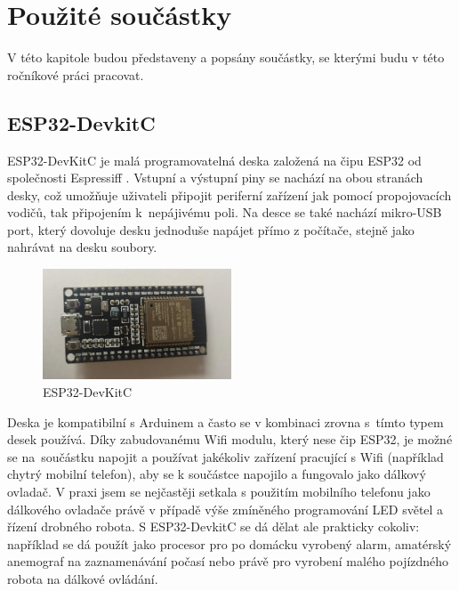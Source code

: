 \chapter{Použité součástky}
V této kapitole budou představeny a popsány součástky, se kterými budu v této ročníkové práci pracovat.

\section{ESP32-DevkitC}
ESP32-DevKitC \cite{devkitc-datasheet} je malá programovatelná deska založená na čipu ESP32 od společnosti Espressiff \cite{espressif}. Vstupní a výstupní piny se nachází na obou stranách desky, což umožňuje uživateli připojit periferní zařízení jak pomocí propojovacích vodičů, tak připojením k~nepájivému poli. Na desce se také nachází mikro-USB port, který dovoluje  desku jednoduše napájet přímo z počítače, stejně jako nahrávat na desku soubory. \cite{devkitc}

\begin{figure}[htbp]
	\centering
	\includegraphics[width=0.5\textwidth]{img/ESPDevKit3.jpg}
	\caption{ESP32-DevKitC}
\end{figure}

Deska je kompatibilní s Arduinem \cite{arduino} a často se v kombinaci zrovna s~tímto typem desek používá. Díky zabudovanému Wifi modulu, který nese čip ESP32,\cite{ESP32} je možné se na~součástku napojit a používat jakékoliv zařízení pracující s Wifi (například chytrý mobilní telefon), aby se k součástce napojilo a fungovalo jako dálkový ovladač. V praxi jsem se nejčastěji setkala s použitím mobilního telefonu jako dálkového ovladače právě v případě výše zmíněného programování LED světel a řízení drobného robota. S ESP32-DevkitC se dá dělat ale prakticky cokoliv: například se dá použít jako procesor pro po domácku vyrobený alarm, amatérský anemograf na zaznamenávání počasí nebo právě pro  vyrobení malého pojízdného robota na dálkové ovládání. 

